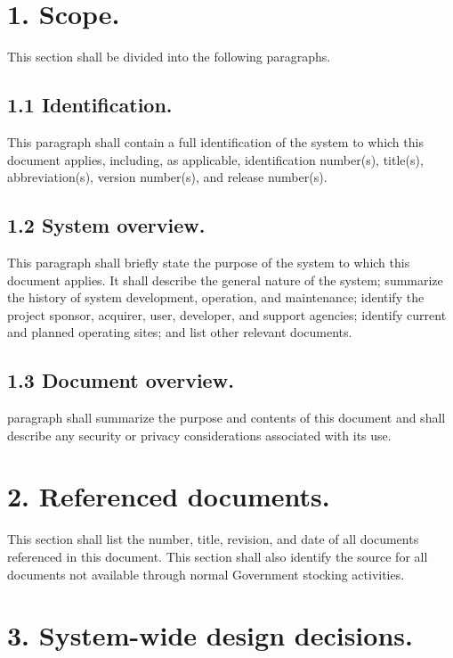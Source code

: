 \section{1. Scope.}

This section shall be divided into the following paragraphs.

\subsection{1.1 Identification.}

This paragraph shall contain a full identification of the system to
which this document applies, including, as applicable, identification
number(s), title(s), abbreviation(s), version number(s), and release
number(s).

\subsection{1.2 System overview.}

This paragraph shall briefly state the purpose of the system to which
this document applies. It shall describe the general nature of the
system; summarize the history of system development, operation, and
maintenance; identify the project sponsor, acquirer, user, developer,
and support agencies; identify current and planned operating sites; and
list other relevant documents.

\subsection{1.3 Document overview.}

paragraph shall summarize the purpose and contents of this document and
shall describe any security or privacy considerations associated with
its use.

\section{2. Referenced documents.}

This section shall list the number, title, revision, and date of all
documents referenced in this document. This section shall also identify
the source for all documents not available through normal Government
stocking activities.

\section{3. System-wide design decisions.}


